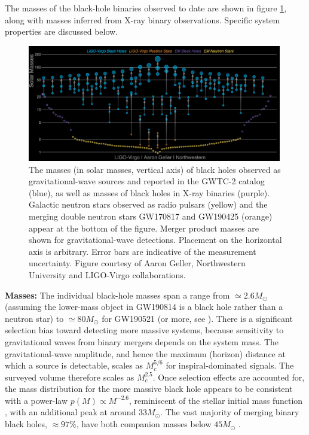 \documentclass[review]{elsarticle}
\begin{document}
The masses of the black-hole binaries observed to date are shown in figure \ref{fig:BHmasses}, along with masses inferred from X-ray binary observations. Specific system properties are discussed below.

\begin{figure}
	\centering
	\includegraphics[width=0.99\textwidth]{Graveyard.png}
	\caption{The masses (in solar masses, vertical axis) of black holes observed as gravitational-wave sources and reported in the GWTC-2 catalog (blue), as well as masses of black holes in X-ray binaries (purple).  Galactic neutron stars observed as radio pulsars (yellow) and the merging double neutron stars GW170817 and GW190425 (orange) appear at the bottom of the figure.  Merger product masses are shown for gravitational-wave detections. Placement on the horizontal axis is arbitrary.  Error bars are indicative of the measurement uncertainty.  Figure courtesy of Aaron Geller, Northwestern University and LIGO-Virgo collaborations.}\label{fig:BHmasses} 
\end{figure}

\textbf{Masses:} The individual black-hole masses span a range from $\simeq 2.6 M_\odot$ (assuming the lower-mass object in GW190814 is a black hole rather than a neutron star) to $\simeq 80 M_\odot$ for GW190521 (or more, see \cite{FishbachHolz:2020,NitzCapano:2021}).  There is a significant selection bias  toward detecting more massive systems, because sensitivity to gravitational waves from binary mergers depends on the system mass.  The gravitational-wave amplitude, and hence the maximum (horizon) distance at which a source is detectable, scales as $M_c^{5/6}$ for inspiral-dominated signals. The surveyed volume therefore scales as $M_c^{2.5}$.  Once selection effects are accounted for, the mass distribution for the more massive black hole appears to be consistent with a power-law $p(M) \propto M^{-2.6}$, reminiscent of the stellar initial mass function \citep{Salpeter:1955}, with an additional peak at around $33 M_\odot$.  The vast majority of merging binary black holes, $\approx 97\%$, have both companion masses below $45 M_\odot$ \citep{GWTC2:pop}.   
\end{document}
